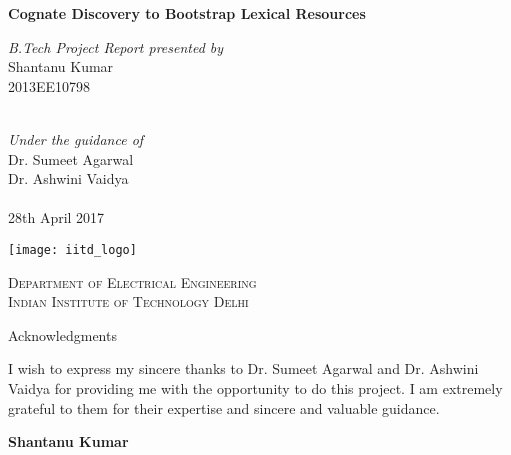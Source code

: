 \begin{titlepage}
\begin{center}

\LARGE{\textsf{\bf Cognate Discovery to Bootstrap Lexical Resources }}\\

\vspace{100pt}

{\normalsize \emph{B.Tech Project Report presented by}} \\
\vspace{10pt}
\Large{{Shantanu Kumar}} \\
{\large 2013EE10798}

\ \\
{\normalsize \emph {Under the guidance of}} \\
\vspace{10pt}
\Large{{ Dr. Sumeet Agarwal}} \\
\vspace{10pt}
\Large{{ Dr. Ashwini Vaidya}} \\


\ \\
\vspace{30pt}
\large{28th April 2017}

\vspace{10pt}
\texttt{[image: iitd\_logo]} \\
\vspace{10pt}

\large{\textsc{Department of Electrical Engineering\\
Indian Institute of Technology Delhi}}

\end{center}
\end{titlepage}

\begin{center}
\LARGE{Acknowledgments} 
\end{center}

\vspace{0.5in}

I wish to express my sincere thanks to Dr. Sumeet Agarwal and Dr. Ashwini Vaidya for providing me with the opportunity to do this project. I am extremely grateful to them for their expertise and sincere and valuable guidance.

\vspace{1.5in}

{\bf Shantanu Kumar}


